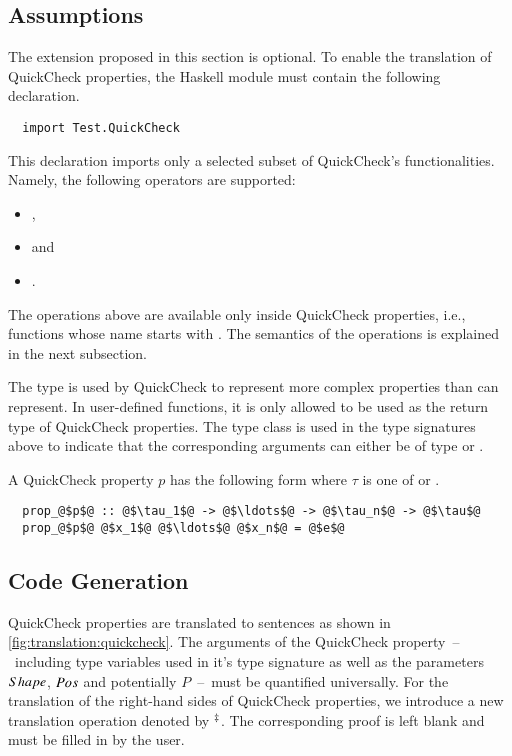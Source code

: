 \subsection{Assumptions} \label{sec:translation:quickcheck:assumptions}
The extension proposed in this section is optional.
To enable the translation of QuickCheck properties, the Haskell module must contain the following  declaration.
\begin{verbatim}
  import Test.QuickCheck
\end{verbatim}
This  declaration imports only a selected subset of QuickCheck's functionalities.
Namely, the following operators are supported:
\begin{itemize}
  \item {},
  \item {} and
  \item {}.
\end{itemize}
The operations above are available only inside QuickCheck properties, i.e., functions whose name starts with .
The semantics of the operations is explained in the next subsection.

The type  is used by QuickCheck to represent more complex properties than  can represent.
In user-defined functions, it is only allowed to be used as the return type of QuickCheck properties.
The type class  is used in the type signatures above to indicate that the corresponding arguments can either be of type  or .

A QuickCheck property $p$ has the following form where $\tau$ is one of  or .
\begin{verbatim}
  prop_@$p$@ :: @$\tau_1$@ -> @$\ldots$@ -> @$\tau_n$@ -> @$\tau$@
  prop_@$p$@ @$x_1$@ @$\ldots$@ @$x_n$@ = @$e$@
\end{verbatim}

\subsection{Code Generation} \label{sec:translation:quickcheck:code-generation}
QuickCheck properties are translated to  sentences as shown in \autoref{fig:translation:quickcheck}.
The arguments of the QuickCheck property~--~including type variables used in it's type signature as well as the parameters $Shape$, $Pos$ and potentially $P$~--~must be quantified universally.
For the translation of the right-hand sides of QuickCheck properties, we introduce a new translation operation denoted by ${}^{\ddag}$.
The corresponding proof is left blank and must be filled in by the user.


